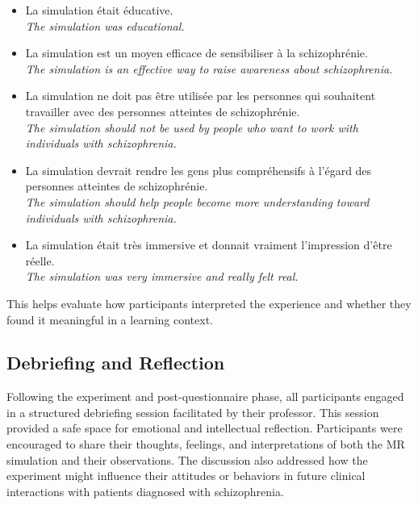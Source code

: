 \begin{itemize}
    \item La simulation était éducative. \\
    \textit{The simulation was educational.}

    \item La simulation est un moyen efficace de sensibiliser à la schizophrénie. \\
    \textit{The simulation is an effective way to raise awareness about schizophrenia.}

    \item La simulation ne doit pas être utilisée par les personnes qui souhaitent travailler avec des personnes atteintes de schizophrénie. \\
    \textit{The simulation should not be used by people who want to work with individuals with schizophrenia.}

    \item La simulation devrait rendre les gens plus compréhensifs à l’égard des personnes atteintes de schizophrénie. \\
    \textit{The simulation should help people become more understanding toward individuals with schizophrenia.}

    \item La simulation était très immersive et donnait vraiment l’impression d’être réelle. \\
    \textit{The simulation was very immersive and really felt real.}
\end{itemize}

This helps evaluate how participants interpreted the experience and whether they found it meaningful in a learning context.

\subsection{Debriefing and Reflection}

Following the experiment and post-questionnaire phase, all participants engaged in a structured debriefing session facilitated by their professor. This session provided a safe space for emotional and intellectual reflection. Participants were encouraged to share their thoughts, feelings, and interpretations of both the MR simulation and their observations. The discussion also addressed how the experiment might influence their attitudes or behaviors in future clinical interactions with patients diagnosed with schizophrenia.

